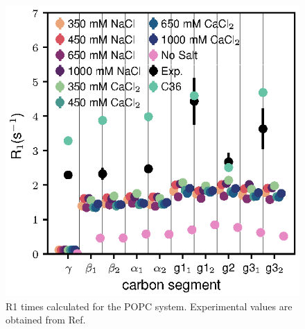 \documentclass[journal=jacsat,manuscript=article,layout=singlecolumn]{achemso}
\begin{document}
\begin{figure}[!hbt]
	\centering
	\includegraphics{correlation_times.eps}
	\caption{R1 times calculated for the POPC system. Experimental values are obtained from Ref.~\cite{antila2020quasi}}
	\label{fig:correlation_times}
\end{figure}

\clearpage

\begin{acknowledgement}


\end{acknowledgement}

\begin{suppinfo}
\end{suppinfo}


\end{document}

